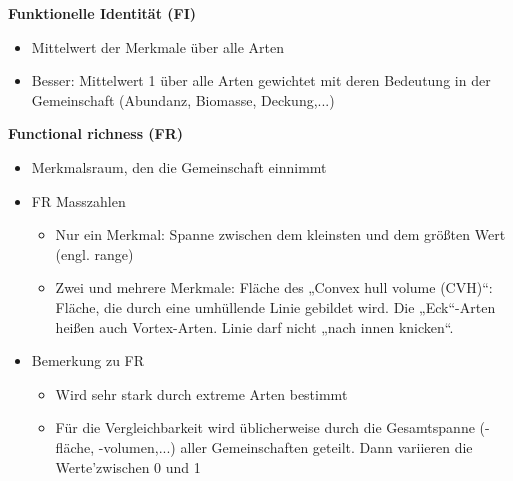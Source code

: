 \textbf{Funktionelle Identität (FI)}
\begin{itemize}
	\item Mittelwert der Merkmale über alle Arten
	\item Besser: Mittelwert 1 über alle Arten gewichtet mit deren Bedeutung in der Gemeinschaft (Abundanz, Biomasse, Deckung,...)
\end{itemize}

\textbf{Functional richness (FR)}\\
\begin{itemize}
	\item Merkmalsraum, den die Gemeinschaft einnimmt
	\item FR Masszahlen
	\begin{itemize}
		\item Nur ein Merkmal: Spanne zwischen dem kleinsten und dem größten Wert (engl. range)
		\item Zwei und mehrere Merkmale: Fläche des „Convex hull volume (CVH)“: Fläche, die durch eine umhüllende Linie gebildet wird. Die „Eck“-Arten heißen auch Vortex-Arten. Linie darf nicht „nach innen knicken“.
	\end{itemize}
	\item Bemerkung zu FR
	\begin{itemize}
		\item Wird sehr stark durch extreme Arten bestimmt
		\item Für die Vergleichbarkeit wird üblicherweise durch die Gesamtspanne (-fläche, -volumen,...) aller Gemeinschaften geteilt. Dann variieren die Werte'zwischen 0 und 1
	\end{itemize}
\end{itemize}